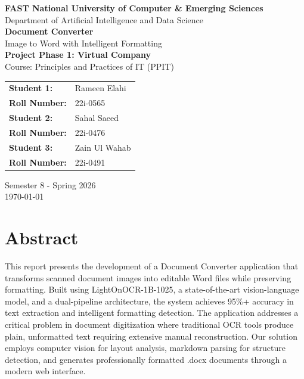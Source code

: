 \documentclass[12pt,a4paper]{article}
\begin{document}
\begin{titlepage}
    \centering
    \vspace*{2cm}
    
    {\LARGE\bfseries FAST National University of Computer \& Emerging Sciences}\\[0.5cm]
    {\large Department of Artificial Intelligence and Data Science}\\[3cm]
    
    {\Huge\bfseries Document Converter}\\[0.5cm]
    {\Large Image to Word with Intelligent Formatting}\\[2cm]
    
    {\large\bfseries Project Phase 1: Virtual Company}\\
    {\large Course: Principles and Practices of IT (PPIT)}\\[3cm]
    
    \begin{tabular}{l l}
        \textbf{Student 1:} & Rameen Elahi \\
        \textbf{Roll Number:} & 22i-0565 \\[0.5cm]
        \textbf{Student 2:} & Sahal Saeed \\
        \textbf{Roll Number:} & 22i-0476 \\[0.5cm]
        \textbf{Student 3:} & Zain Ul Wahab \\
        \textbf{Roll Number:} & 22i-0491 \\
    \end{tabular}
    
    \vfill
    
    {\large Semester 8 - Spring 2026}\\
    {\large \today}
    
\end{titlepage}

\tableofcontents
\newpage

\section*{Abstract}

This report presents the development of a Document Converter application that transforms scanned document images into editable Word files while preserving formatting. Built using LightOnOCR-1B-1025, a state-of-the-art vision-language model, and a dual-pipeline architecture, the system achieves 95\%+ accuracy in text extraction and intelligent formatting detection. The application addresses a critical problem in document digitization where traditional OCR tools produce plain, unformatted text requiring extensive manual reconstruction. Our solution employs computer vision for layout analysis, markdown parsing for structure detection, and generates professionally formatted .docx documents through a modern web interface.
\end{document}
